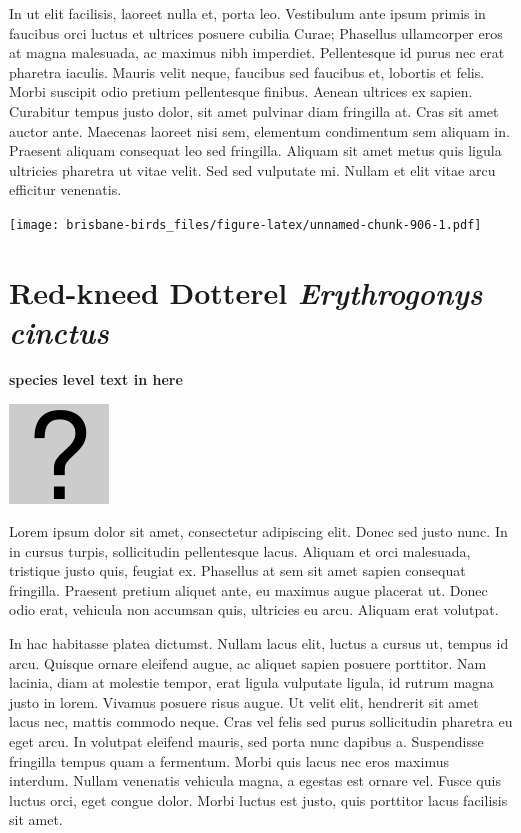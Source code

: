\documentclass[]{book}
\let\origfigure\figure
\let\endorigfigure\endfigure
\renewenvironment{figure}[1][2] {
  \expandafter\origfigure\expandafter[H]
} {
  \endorigfigure
}
\begin{document}
In ut elit facilisis, laoreet nulla et, porta leo. Vestibulum ante ipsum
primis in faucibus orci luctus et ultrices posuere cubilia Curae;
Phasellus ullamcorper eros at magna malesuada, ac maximus nibh
imperdiet. Pellentesque id purus nec erat pharetra iaculis. Mauris velit
neque, faucibus sed faucibus et, lobortis et felis. Morbi suscipit odio
pretium pellentesque finibus. Aenean ultrices ex sapien. Curabitur
tempus justo dolor, sit amet pulvinar diam fringilla at. Cras sit amet
auctor ante. Maecenas laoreet nisi sem, elementum condimentum sem
aliquam in. Praesent aliquam consequat leo sed fringilla. Aliquam sit
amet metus quis ligula ultricies pharetra ut vitae velit. Sed sed
vulputate mi. Nullam et elit vitae arcu efficitur venenatis.

\begin{figure}
\centering
\texttt{[image: brisbane-birds\_files/figure-latex/unnamed-chunk-906-1.pdf]}
\caption{\label{fig:unnamed-chunk-906}insert figure caption}
\end{figure}

\section{\texorpdfstring{Red-kneed Dotterel \emph{Erythrogonys
cinctus}}{Red-kneed Dotterel Erythrogonys cinctus}}\label{red-kneed-dotterel-erythrogonys-cinctus}

\textbf{species level text in here}

\begin{figure}
\centering
\includegraphics{assets/missing.png}
\caption{No image for species}
\end{figure}

Lorem ipsum dolor sit amet, consectetur adipiscing elit. Donec sed justo
nunc. In in cursus turpis, sollicitudin pellentesque lacus. Aliquam et
orci malesuada, tristique justo quis, feugiat ex. Phasellus at sem sit
amet sapien consequat fringilla. Praesent pretium aliquet ante, eu
maximus augue placerat ut. Donec odio erat, vehicula non accumsan quis,
ultricies eu arcu. Aliquam erat volutpat.

In hac habitasse platea dictumst. Nullam lacus elit, luctus a cursus ut,
tempus id arcu. Quisque ornare eleifend augue, ac aliquet sapien posuere
porttitor. Nam lacinia, diam at molestie tempor, erat ligula vulputate
ligula, id rutrum magna justo in lorem. Vivamus posuere risus augue. Ut
velit elit, hendrerit sit amet lacus nec, mattis commodo neque. Cras vel
felis sed purus sollicitudin pharetra eu eget arcu. In volutpat eleifend
mauris, sed porta nunc dapibus a. Suspendisse fringilla tempus quam a
fermentum. Morbi quis lacus nec eros maximus interdum. Nullam venenatis
vehicula magna, a egestas est ornare vel. Fusce quis luctus orci, eget
congue dolor. Morbi luctus est justo, quis porttitor lacus facilisis sit
amet.
\end{document}
